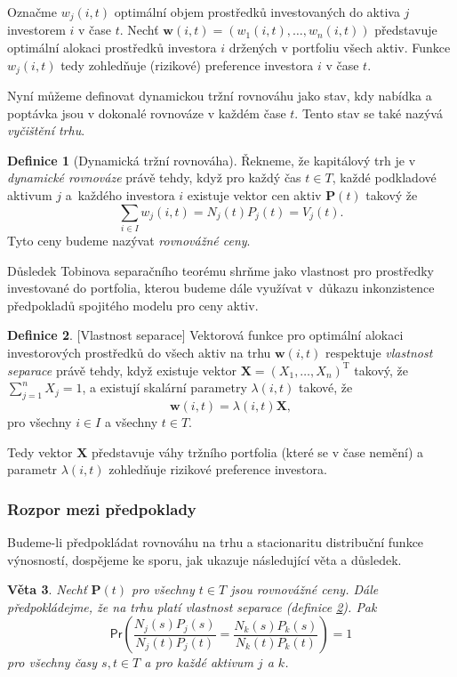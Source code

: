 \documentclass[a4paper,12pt]{report}
\newtheorem{veta}{Věta}
\theoremstyle{definition} \newtheorem{definice}[veta]{Definice}
\theoremstyle{remark}
\begin{document}
Označme $w_{j}(i,t)$ optimální objem prostředků investovaných do aktiva $j$ investorem $i$ v čase $t$.
Nechť $\boldsymbol{w}(i,t)=(w_{1}(i,t),\dots,w_{n}(i,t))$ představuje optimální alokaci prostředků investora $i$ držených v portfoliu všech aktiv.
Funkce $w_{j}(i,t)$ tedy zohledňuje (rizikové) preference investora $i$ v čase $t$.
  
Nyní můžeme definovat dynamickou tržní rovnováhu jako stav, kdy  na\-bíd\-ka a poptávka jsou v dokonalé rovnováze v každém čase $t$.
Tento stav se také nazývá \textit{vyčištění trhu}.
         
\begin{definice}[Dynamická tržní rovnováha]
Řekneme, že kapitálový trh je v \textit{dynamické rovnováze} právě tehdy, když pro každý čas $t\in T$, každé podkladové aktivum $j$ a~každého investora $i$ existuje vektor cen aktiv $\boldsymbol{P}(t)$ takový že
$$\sum_{i\in I} w_{j}(i,t)=N_j(t)P_j(t)=V_j(t).$$
Tyto ceny budeme nazývat \textit{rovnovážné ceny}.
\end{definice}

Důsledek Tobinova separačního teorému shrňme jako vlastnost pro pro\-střed\-ky investované do portfolia, kterou budeme dále využívat v~důkazu inkonzistence předpokladů spojitého modelu pro ceny aktiv.
\begin{definice}\label{vlastnost_separace}[Vlastnost separace]
Vektorová funkce pro optimální alokaci investorových prostředků do všech aktiv na trhu $\boldsymbol{w}(i,t)$ respektuje \textit{vlastnost separace} právě tehdy, když existuje vektor $\boldsymbol{X}=(X_1,\dots,X_n)^\mathrm{T}$ takový, že $\sum_{j=1}^nX_j=1$, a existují skalární parametry $\lambda(i,t)$ takové, že
$$\boldsymbol{w}(i,t)=\lambda(i,t)\boldsymbol{X},$$
pro všechny $i\in I$ a všechny $t\in T$.
\end{definice}
Tedy vektor $\boldsymbol{X}$ představuje váhy tržního portfolia (které se v čase nemění) a parametr $\lambda(i,t)$ zohledňuje rizikové preference investora.

\subsubsection{Rozpor mezi předpoklady}
Budeme-li předpokládat rovnováhu na trhu a stacionaritu distribuční funkce výnosností, dospějeme ke sporu, jak ukazuje následující věta a důsledek.

\begin{veta} \label{T1}
Nechť $\boldsymbol{P}(t)$ pro všechny $t\in T$  jsou rovnovážné ceny.
Dále před\-pokládejme, že na trhu platí vlastnost separace (definice \ref{vlastnost_separace}).
Pak
\begin{equation}\label{T1_eq}
\mathsf{Pr}\left(\frac{N_j(s)P_j(s)}{N_j(t)P_j(t)}=\frac{N_k(s)P_k(s)}{N_k(t)P_k(t)}\right)=1
\end{equation}
pro všechny časy $s,t\in T$  a pro každé aktivum $j$ a $k$.
\end{veta}
\end{document}

